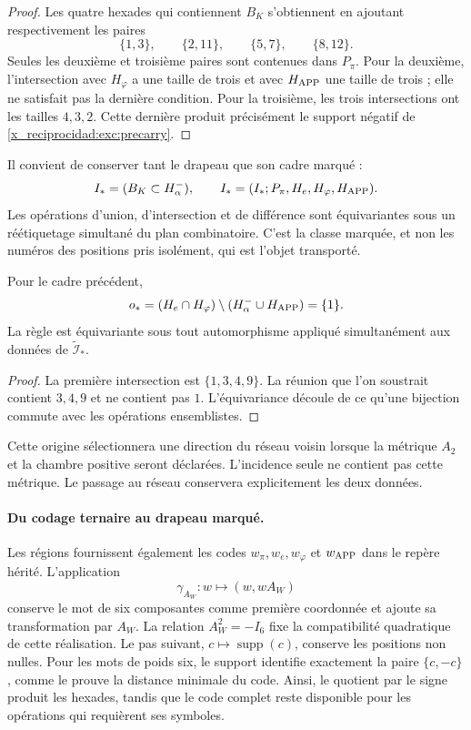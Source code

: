 \begin{proof}
Les quatre hexades qui contiennent $B_K$ s'obtiennent en ajoutant respectivement les paires
\[
 \{1,3\},\qquad\{2,11\},\qquad\{5,7\},\qquad\{8,12\}.
\]
Seules les deuxième et troisième paires sont contenues dans $P_\pi$. Pour la
deuxième, l'intersection avec $H_\varphi$ a une taille de trois et avec
$H_{\rm APP}$ une taille de trois ; elle ne satisfait pas la dernière condition. Pour la
troisième, les trois intersections ont les tailles $4,3,2$. Cette dernière
produit précisément le support négatif de \eqref{x_reciprocidad:exc:precarry}.
\end{proof}

Il convient de conserver tant le drapeau que son cadre marqué :
\[
 \mathcal I_*=(B_K\subset H^-_\alpha),\qquad
 \widetilde{\mathcal I}_*
   =(\mathcal I_*;P_\pi,H_e,H_\varphi,H_{\rm APP}).
\]
Les opérations d'union, d'intersection et de différence sont équivariantes sous un réétiquetage simultané du plan combinatoire. C'est la classe marquée, et non les numéros des positions pris isolément, qui est l'objet transporté.

\begin{lemma}
\label{x_reciprocidad:exc:origen}
Pour le cadre précédent,
\[
 o_*=(H_e\cap H_\varphi)
           \setminus(H^-_\alpha\cup H_{\rm APP})=\{1\}.
\]
La règle est équivariante sous tout automorphisme appliqué simultanément
aux données de $\widetilde{\mathcal I}_*$.
\end{lemma}

\begin{proof}
La première intersection est $\{1,3,4,9\}$. La réunion que l'on soustrait
contient $3,4,9$ et ne contient pas $1$. L'équivariance découle de ce qu'une
bijection commute avec les opérations ensemblistes.
\end{proof}

Cette origine sélectionnera une direction du réseau voisin lorsque la métrique $A_2$ et la chambre positive seront déclarées. L'incidence seule ne contient pas cette métrique. Le passage au réseau conservera explicitement les deux données.


\paragraph{Du codage ternaire au drapeau marqué.}
\label{x_reciprocidad:inc-ampl-bandera}
Les régions fournissent également les codes $w_\pi,w_e,w_\varphi$ et
$w_{\rm APP}$ dans le repère hérité. L'application
\[
 \gamma_{A_W}:w\longmapsto(w,wA_W)
\]
conserve le mot de six composantes comme première coordonnée et ajoute
sa transformation par $A_W$. La relation $A_W^2=-I_6$ fixe la
compatibilité quadratique de cette réalisation. Le pas suivant,
$c\mapsto\operatorname{supp}(c)$, conserve les positions non nulles.
Pour les mots de poids six, le support identifie exactement la paire
$\{c,-c\}$, comme le prouve la distance minimale du code. Ainsi,
le quotient par le signe produit les hexades, tandis que le code complet
reste disponible pour les opérations qui requièrent ses symboles.

